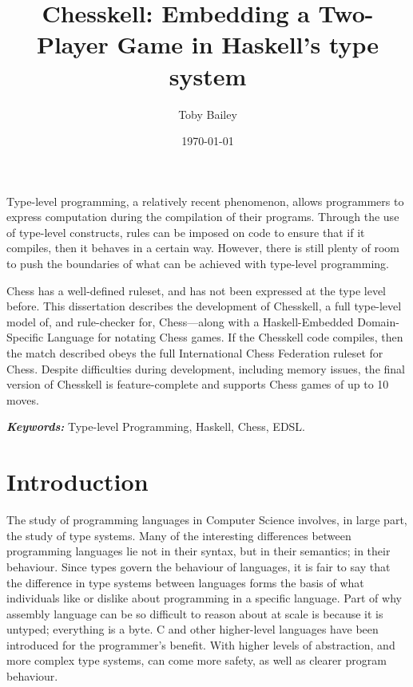 \documentclass[12pt, a4paper, bibliography=totocnumbered]{scrreprt}
\title{Chesskell: Embedding a Two-Player Game in Haskell's type system}
\author{Toby Bailey}
\date{\today}
\renewenvironment{abstract}
 {\small
  \begin{center}
  \bfseries \textit{\abstractname}\vspace{-.5em}\vspace{0pt}
  \end{center}
  \quotation}
 {\endquotation}
\begin{document}
\begin{titlepage}
    \maketitle
\end{titlepage}

{}
\begin{abstract}
    Type-level programming, a relatively recent phenomenon, allows programmers to express computation during the compilation of their programs. Through the use of type-level constructs, rules can be imposed on code to ensure that if it compiles, then it behaves in a certain way. However, there is still plenty of room to push the boundaries of what can be achieved with type-level programming.

    Chess has a well-defined ruleset, and has not been expressed at the type level before. This dissertation describes the development of Chesskell, a full type-level model of, and rule-checker for, Chess---along with a Haskell-Embedded Domain-Specific Language for notating Chess games. If the Chesskell code compiles, then the match described obeys the full International Chess Federation ruleset for Chess. Despite difficulties during development, including memory issues, the final version of Chesskell is feature-complete and supports Chess games of up to 10 moves.

    \textbf{\textit{Keywords:}} Type-level Programming, Haskell, Chess, EDSL.
\end{abstract}

{
\newpage  %
{}
\renewcommand{\normalfont}{\usekomafont{sectioning}}
}

\chapter{Introduction}

The study of programming languages in Computer Science involves, in large part, the study of type systems. Many of the interesting differences between programming languages lie not in their syntax, but in their semantics; in their behaviour. Since types govern the behaviour of languages, it is fair to say that the difference in type systems between languages forms the basis of what individuals like or dislike about programming in a specific language. Part of why assembly language can be so difficult to reason about at scale is because it is untyped; everything is a byte. C and other higher-level languages have been introduced for the programmer's benefit. With higher levels of abstraction, and more complex type systems, can come more safety, as well as clearer program behaviour.
\end{document}
